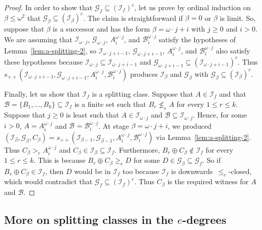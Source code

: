 \documentclass[11pt]{amsart}
\begin{document}
\begin{proof}
In order to show that $\mathcal{G}_f \subseteq (\mathcal{I}_f)^c$, let us 
prove by ordinal induction on $\beta \leq \omega^2$ that $\mathcal{G}_\beta 
\subseteq (\mathcal{I}_\beta)^c$. The claim is straightforward if $\beta=0$ 
or $\beta$ is limit. So, suppose that $\beta$ is a successor and has the form 
$\beta=\omega \cdot j+i$ with $j \ge 0$ and $i>0$. We are assuming that 
$\mathcal{I}_{\omega\cdot j}$, $\mathcal{G}_{\omega\cdot j}$, 
$A_i^{\omega\cdot j}$, and $\mathcal{B}_i^{\omega\cdot j}$ satisfy the 
hypotheses of Lemma~\ref{lem:a-splitting-2}, so $\mathcal{I}_{\omega \cdot 
j+i-1}$, $\mathcal{G}_{\omega \cdot j+i-1}$, $A_i^{\omega\cdot j}$, and 
$\mathcal{B}_i^{\omega\cdot j}$ also satisfy these hypotheses because 
$\mathcal{I}_{\omega \cdot j} \subseteq \mathcal{I}_{\omega \cdot j+i-1}$ and 
$\mathcal{G}_{\omega \cdot j+i-1} \subseteq (\mathcal{I}_{\omega \cdot 
j+i-1})^c$. Thus $s_{++}(\mathcal{I}_{\omega\cdot j+i-1}, 
\mathcal{G}_{\omega\cdot j+i-1}, A_i^{\omega\cdot j},  
\mathcal{B}_i^{\omega\cdot j})$ produces $\mathcal{I}_\beta$ and 
$\mathcal{G}_\beta$ with $\mathcal{G}_\beta \subseteq (\mathcal{I}_\beta)^c$. 

Finally, let us show that $\mathcal{I}_f$ is a splitting class. Suppose that 
$A \in \mathcal{I}_f$ and that $\mathcal{B}=\{B_1, \ldots, B_k\} \subseteq 
\mathcal{I}_f$ is a finite set such that $B_r \nleq_e A$ for every $1\le r 
\le k$. Suppose that $j \geq 0$ is least such that $A \in \mathcal{I}_{\omega 
\cdot j}$ and $\mathcal{B} \subseteq \mathcal{I}_{\omega \cdot j}$. Hence, 
for some $i >0$, $A=A_i^{\omega \cdot j}$ and 
$\mathcal{B}=\mathcal{B}_i^{\omega \cdot j}$. At stage $\beta = {\omega \cdot 
j} + i$, we produced $(\mathcal{I}_\beta, \mathcal{G}_\beta, C_\beta) = 
s_{++}(\mathcal{I}_{\beta-1}, \mathcal{G}_{\beta-1}, A_i^{\omega \cdot j}, 
\mathcal{B}_i^{\omega \cdot j})$ via Lemma~\ref{lem:a-splitting-2}.  Thus 
$C_\beta  >_e A_i^{\omega \cdot j}$ and $C_\beta \in \mathcal{I}_\beta 
\subseteq \mathcal{I}_f$.  Furthermore, $B_r \oplus C_\beta \notin 
\mathcal{I}_f$ for every $1 \leq r \leq k$.  This is because $B_r \oplus 
C_\beta \geq_e D$ for some $D \in \mathcal{G}_\beta \subseteq \mathcal{G}_f$. 
So if $B_r \oplus C_\beta \in \mathcal{I}_f$, then $D$ would be in 
$\mathcal{I}_f$ too because $\mathcal{I}_f$ is downwards~$\le_e$-closed, 
which would contradict that $\mathcal{G}_f \subseteq (\mathcal{I}_f)^c$. Thus 
$C_\beta$ is the required witness for $A$ and $\mathcal{B}$. 
\end{proof}

\subsection{More on splitting classes in the $e$-degrees}\label{ssct:c}
\end{document}
